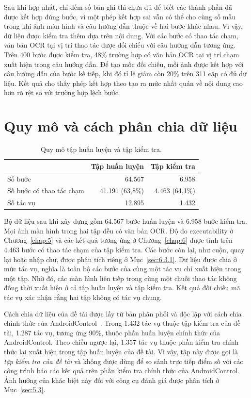 Sau khi hợp nhất, chỉ đếm số bản ghi thì chưa đủ để biết các thành phần đã được kết hợp đúng bước, vì một phép kết hợp sai vẫn có thể cho cùng số mẫu trong khi ảnh màn hình và câu hướng dẫn thuộc về hai bước khác nhau. Vì vậy, dữ liệu được kiểm tra thêm dựa trên nội dung. Với các bước có thao tác chạm, văn bản OCR tại vị trí thao tác được đối chiếu với câu hướng dẫn tương ứng. Trên 400 bước được kiểm tra, 48\% trường hợp có văn bản OCR tại vị trí chạm xuất hiện trong câu hướng dẫn. Để tạo mốc đối chiếu, mỗi ảnh được kết hợp với câu hướng dẫn của bước kế tiếp, khi đó tỉ lệ giảm còn 20\% trên 311 cặp có đủ dữ liệu. Kết quả cho thấy phép kết hợp theo  tạo ra mức nhất quán về nội dung cao hơn rõ rệt so với trường hợp lệch bước.

\section{Quy mô và cách phân chia dữ liệu}\label{sec:3.3}

\begin{table}[htbp]
\centering\small
\caption{Quy mô tập huấn luyện và tập kiểm tra.}\label{tab:3.3}
\begin{tabular}{@{}lrr@{}}
\toprule
 & \textbf{Tập huấn luyện} & \textbf{Tập kiểm tra} \\
\midrule
Số bước & 64.567 & 6.958 \\
Số bước có thao tác chạm & 41.191 (63,8\%) & 4.463 (64,1\%) \\
Số tác vụ & 12.895 & 1.432 \\
\bottomrule
\end{tabular}
\end{table}

Bộ dữ liệu sau khi xây dựng gồm 64.567 bước huấn luyện và 6.958 bước kiểm tra. Mọi ảnh màn hình trong hai tập đều có văn bản OCR. Độ đo executability ở Chương~\ref{chap:5} và các kết quả tương ứng ở Chương~\ref{chap:6} được tính trên 4.463 bước có thao tác chạm của tập kiểm tra. Các bước còn lại, như cuộn, quay lại hoặc nhập chữ, được phân tích riêng ở Mục~\ref{sec:6.3.1}. Dữ liệu được chia ở mức tác vụ, nghĩa là toàn bộ các bước của cùng một tác vụ chỉ xuất hiện trong một tập. Nhờ đó, các màn hình liên tiếp trong cùng một chuỗi thao tác không đồng thời xuất hiện ở cả tập huấn luyện và tập kiểm tra. Kết quả đối chiếu mã tác vụ xác nhận rằng hai tập không có tác vụ chung.

Cách chia dữ liệu của đề tài được lấy từ bản phân phối  và độc lập với cách chia chính thức của AndroidControl~\cite{androidcontrol}. Trong 1.432 tác vụ thuộc tập kiểm tra của đề tài, 1.287 tác vụ, tương ứng 90\%, thuộc phần huấn luyện chính thức của AndroidControl. Theo chiều ngược lại, 1.357 tác vụ thuộc phần kiểm tra chính thức lại xuất hiện trong tập huấn luyện của đề tài. Vì vậy, tập này được gọi là \emph{tập kiểm tra của đề tài} và không được dùng để so sánh trực tiếp điểm số với các công trình báo cáo kết quả trên phần kiểm tra chính thức của AndroidControl. Ảnh hưởng của khác biệt này đối với công cụ đánh giá được phân tích ở Mục~\ref{sec:5.3}.

